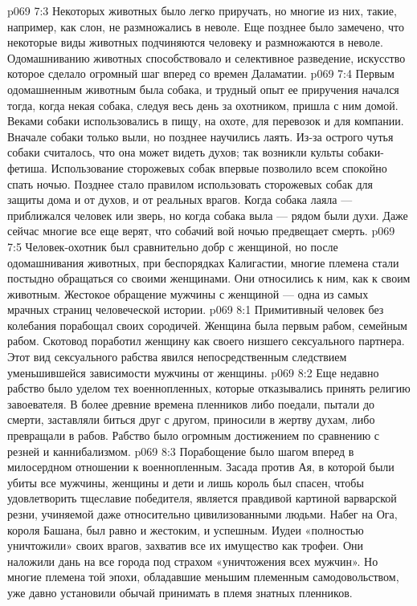 \vs p069 7:3 Некоторых животных было легко приручать, но многие из них, такие, например, как слон, не размножались в неволе. Еще позднее было замечено, что некоторые виды животных подчиняются человеку и размножаются в неволе. Одомашниванию животных способствовало и селективное разведение, искусство которое сделало огромный шаг вперед со времен Даламатии.
\vs p069 7:4 Первым одомашненным животным была собака, и трудный опыт ее приручения начался тогда, когда некая собака, следуя весь день за охотником, пришла с ним домой. Веками собаки использовались в пищу, на охоте, для перевозок и для компании. Вначале собаки только выли, но позднее научились лаять. Из\hyp{}за острого чутья собаки считалось, что она может видеть духов; так возникли культы собаки\hyp{}фетиша. Использование сторожевых собак впервые позволило всем спокойно спать ночью. Позднее стало правилом использовать сторожевых собак для защиты дома и от духов, и от реальных врагов. Когда собака лаяла --- приближался человек или зверь, но когда собака выла --- рядом были духи. Даже сейчас многие все еще верят, что собачий вой ночью предвещает смерть.
\vs p069 7:5 Человек\hyp{}охотник был сравнительно добр с женщиной, но после одомашнивания животных, при беспорядках Калигастии, многие племена стали постыдно обращаться со своими женщинами. Они относились к ним, как к своим животным. Жестокое обращение мужчины с женщиной --- одна из самых мрачных страниц человеческой истории.
\vs p069 8:1 Примитивный человек без колебания порабощал своих сородичей. Женщина была первым рабом, семейным рабом. Скотовод поработил женщину как своего низшего сексуального партнера. Этот вид сексуального рабства явился непосредственным следствием уменьшившейся зависимости мужчины от женщины.
\vs p069 8:2 Еще недавно рабство было уделом тех военнопленных, которые отказывались принять религию завоевателя. В более древние времена пленников либо поедали, пытали до смерти, заставляли биться друг с другом, приносили в жертву духам, либо превращали в рабов. Рабство было огромным достижением по сравнению с резней и каннибализмом.
\vs p069 8:3 Порабощение было шагом вперед в милосердном отношении к военнопленным. Засада против Ая, в которой были убиты все мужчины, женщины и дети и лишь король был спасен, чтобы удовлетворить тщеславие победителя, является правдивой картиной варварской резни, учиняемой даже относительно цивилизованными людьми. Набег на Ога, короля Башана, был равно и жестоким, и успешным. Иудеи «полностью уничтожили» своих врагов, захватив все их имущество как трофеи. Они наложили дань на все города под страхом «уничтожения всех мужчин». Но многие племена той эпохи, обладавшие меньшим племенным самодовольством, уже давно установили обычай принимать в племя знатных пленников.
